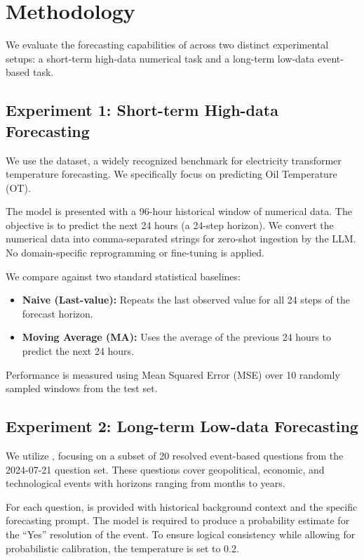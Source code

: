 \section{Methodology}

We evaluate the forecasting capabilities of \methodname across two distinct experimental setups: a short-term high-data numerical task and a long-term low-data event-based task.

\subsection{Experiment 1: Short-term High-data Forecasting}

 We use the \ettm dataset, a widely recognized benchmark for electricity transformer temperature forecasting. We specifically focus on predicting Oil Temperature (OT).

 The model is presented with a 96-hour historical window of numerical data. The objective is to predict the next 24 hours (a 24-step horizon). We convert the numerical data into comma-separated strings for zero-shot ingestion by the LLM. No domain-specific reprogramming or fine-tuning is applied.

 We compare \methodname against two standard statistical baselines:
\begin{itemize}[leftmargin=*,itemsep=0pt,topsep=0pt]
    \item {\bf Naive (Last-value):} Repeats the last observed value for all 24 steps of the forecast horizon.
    \item {\bf Moving Average (MA):} Uses the average of the previous 24 hours to predict the next 24 hours.
\end{itemize}

 Performance is measured using Mean Squared Error (MSE) over 10 randomly sampled windows from the test set.

\subsection{Experiment 2: Long-term Low-data Forecasting}

 We utilize \forecastbench, focusing on a subset of 20 resolved event-based questions from the 2024-07-21 question set. These questions cover geopolitical, economic, and technological events with horizons ranging from months to years.

 For each question, \methodname is provided with historical background context and the specific forecasting prompt. The model is required to produce a probability estimate for the ``Yes'' resolution of the event. To ensure logical consistency while allowing for probabilistic calibration, the temperature is set to 0.2.

